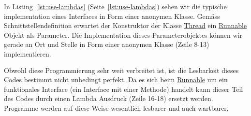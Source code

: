 

\mode*

In Listing~\ref{lst:use-lambdas} (Seite~\ref{lst:use-lambdas}) sehen wir die typische implementation
eines Interfaces in Form einer anonymen Klasse. Gemäss Schnittstellendefinition erwartet der Konstruktor
der Klasse \href{https://docs.oracle.com/en/java/javase/11/docs/api/java.base/java/lang/Thread.html}{Thread}
ein \href{https://docs.oracle.com/en/java/javase/11/docs/api/java.base/java/lang/Runnable.html}{Runnable}
Objekt als Parameter. Die Implementation dieses Parameterobjektes können wir gerade an Ort und Stelle
in Form einer anonymen Klasse (Zeile 8-13) implementieren.

Obwohl diese Programmierung sehr weit verbreitet ist, ist die Lesbarkeit dieses Codes bestimmt nicht
unbedingt perfekt. Da es sich beim
\href{https://docs.oracle.com/en/java/javase/11/docs/api/java.base/java/lang/Runnable.html}{Runnable}
um ein funktionales Interface (ein Interface mit einer Methode) handelt kann dieser Teil des Codes durch
einen Lambda Ausdruck (Zeile 16-18) ersetzt werden. Programme werden auf diese Weise wesentlich lesbarer und
auch wartbarer.




